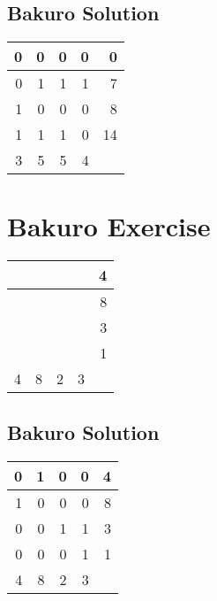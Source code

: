 \documentclass[]{article}
\begin{document}
 \subsection{Bakuro Solution} 
\begin{tabular}{rrrrr}
\hline
 0 & 0 & 0 & 0 &  0 \\ \hline
 0 & 1 & 1 & 1 &  7 \\ \hline
 1 & 0 & 0 & 0 &  8 \\ \hline
 1 & 1 & 1 & 0 & 14 \\ \hline
 3 & 5 & 5 & 4 &    \\ \hline
\hline
\end{tabular}\newpage\section{Bakuro Exercise}\begin{tabular}{rrrrr}
\hline
   &   &   &   & 4 \\ \hline
   &   &   &   & 8 \\ \hline
   &   &   &   & 3 \\ \hline
   &   &   &   & 1 \\ \hline
 4 & 8 & 2 & 3 &   \\ \hline
\hline
\end{tabular}\newpage 
 \subsection{Bakuro Solution} 
\begin{tabular}{rrrrr}
\hline
 0 & 1 & 0 & 0 & 4 \\ \hline
 1 & 0 & 0 & 0 & 8 \\ \hline
 0 & 0 & 1 & 1 & 3 \\ \hline
 0 & 0 & 0 & 1 & 1 \\ \hline
 4 & 8 & 2 & 3 &   \\ \hline
\hline
\end{tabular}\newpage
 
\end{document}
